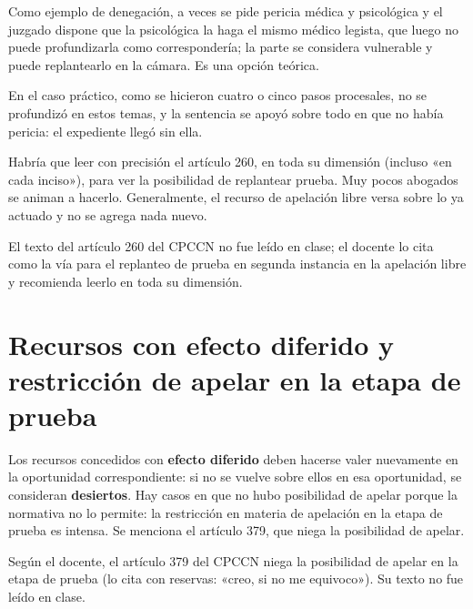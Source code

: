 \documentclass[12pt,oneside]{book}
\begin{document}
Como ejemplo de denegación, a veces se pide pericia médica y psicológica y el juzgado dispone que la psicológica la haga el mismo médico legista, que luego no puede profundizarla como correspondería; la parte se considera vulnerable y puede replantearlo en la cámara. Es una opción teórica.

En el caso práctico, como se hicieron cuatro o cinco pasos procesales, no se profundizó en estos temas, y la sentencia se apoyó sobre todo en que no había pericia: el expediente llegó sin ella.

Habría que leer con precisión el artículo 260, en toda su dimensión (incluso «en cada inciso»), para ver la posibilidad de replantear prueba. Muy pocos abogados se animan a hacerlo. Generalmente, el recurso de apelación libre versa sobre lo ya actuado y no se agrega nada nuevo.

\begin{note}
El texto del artículo 260 del CPCCN no fue leído en clase; el docente lo cita como la vía para el replanteo de prueba en segunda instancia en la apelación libre y recomienda leerlo en toda su dimensión.
\end{note}

\section{Recursos con efecto diferido y restricción de apelar en la etapa de prueba}

Los recursos concedidos con \textbf{efecto diferido} deben hacerse valer nuevamente en la oportunidad correspondiente: si no se vuelve sobre ellos en esa oportunidad, se consideran \textbf{desiertos}. Hay casos en que no hubo posibilidad de apelar porque la normativa no lo permite: la restricción en materia de apelación en la etapa de prueba es intensa. Se menciona el artículo 379, que niega la posibilidad de apelar.

\begin{note}
Según el docente, el artículo 379 del CPCCN niega la posibilidad de apelar en la etapa de prueba (lo cita con reservas: «creo, si no me equivoco»). Su texto no fue leído en clase.
\end{note}
\end{document}
